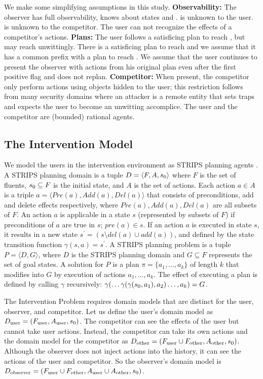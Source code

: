 We make some simplifying assumptions in this study.
\textbf{Observability:} 
The observer has full observability, knows about states \desired and \undesired.
\undesired is unknown to the user. \desired is unknown to the competitor.
The user can not recognize the effects of a competitor's actions. 
\textbf{Plans:} 
The user follows a satisficing plan to reach \desired, but may reach \undesired unwittingly. 
There is a satisficing plan to reach \dandu and we assume that it has a common prefix with a plan to reach \desired. We assume that the user continues to present the observer with actions from his original plan even after the first positive flag and does not replan. 
\textbf{Competitor:}
When present, the competitor only perform actions using objects hidden to the user; this restriction follows from many security domains where an attacker is a remote entity that sets traps and expects the user to become an unwitting accomplice.
The user and the competitor are (bounded) rational agents.

\subsection{The Intervention Model}
\label{sec:models}
We model the users in the intervention environment as STRIPS planning agents \cite{fikes1971strips}.
A STRIPS planning domain is a tuple $D=\langle F, A, s_0\rangle$
where $F$ is the set of fluents, $s_0\subseteq F$ is the initial state, and $A$ is the set of actions.
Each action $a \in A$ is a triple $a=\langle Pre(a), Add(a), Del(a)\rangle$ that consists of preconditions, add and delete effects respectively, where $Pre(a), Add(a), Del(a)$ are all subsets of $F$. 
An action $a$ is applicable in a state $s$ (represented by subsets of $F$) if preconditions of $a$ are true in $s$; $pre(a) \in s$. 
If an action $a$ is executed in state $s$, it results in a new state $s^{\prime} = (s \setminus del(a) \cup add(a))$, and defined by the state transition function $\gamma(s,a)=s^\prime$.
A STRIPS planning problem  is a tuple $ P = \langle D, G \rangle$, where $D$ is the STRIPS planning domain and $G  \subseteq F$ represents the set of goal states. 
A solution for $P$ is a plan $\pi = \{a_1, \dots ,a_k\}$ of length $k$ that modifies \initialState into $G$ by execution of actions $a_1, \dots, a_k$. The effect of executing a plan is defined by calling $\gamma$ recursively: $\gamma(\ldots\gamma(\gamma(s_0,a_1),a_2)\ldots , a_k) = G$.

The Intervention Problem requires domain models that are distinct for the user, observer, and competitor.
Let us define the user's domain model as $D_{\textnormal{user}} = (F_{\textnormal{user}}, A_{\textnormal{user}}, s_0)$.
The competitor can see the effects of the user but cannot take user actions.  
Instead, the competitor can take its own actions and the domain model for the competitor as $D_{\textnormal{other}} = (F_{\textnormal{user}} \cup F_{\textnormal{other}}, A_{\textnormal{other}}, s_0)$.
Although the observer does not inject actions into the history, it can see the actions of the user and competitor.
So the observer's domain model is $D_{\textnormal{observer}} = (F_{\textnormal{user}} \cup F_{\textnormal{other}}, A_{\textnormal{user}} \cup A_{\textnormal{other}}, s_0)$.

